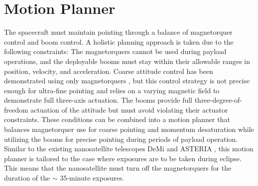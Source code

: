 \section{Motion Planner}
\label{sec:wigglesat:planner}
The spacecraft must maintain pointing through a balance of magnetorquer control and boom control. A holistic planning approach is taken due to the following constraints: The magnetorquers cannot be used during payload operations, and the deployable booms must stay within their allowable ranges in position, velocity, and acceleration.  Coarse attitude control has been demonstrated using only magnetorquers \cite{gatherer2019}, but this control strategy is not precise enough for ultra-fine pointing and relies on a varying magnetic field to demonstrate full three-axis actuation. The booms provide full three-degree-of-freedom actuation of the attitude but must avoid violating their actuator constraints. These conditions can be combined into a motion planner that balances magnetorquer use for coarse pointing and momentum desaturation while utilizing the booms for precise pointing during periods of payload operation. Similar to the existing nanosatellite telescopes DeMi \cite{allan2018} and ASTERIA \cite{knapp2020}, this motion planner is tailored to the case where exposures are to be taken during eclipse. This means that the nanosatellite must turn off the magnetorquers for the duration of the $\sim$ 35-minute exposures.  

